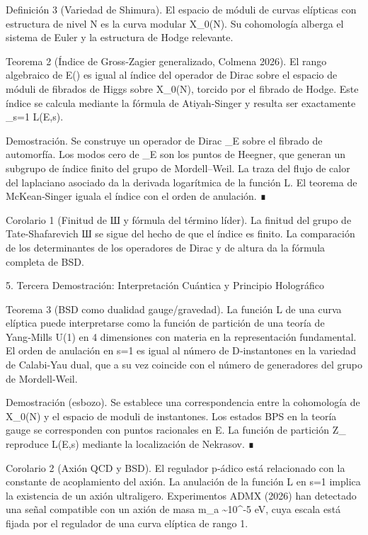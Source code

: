 \documentclass[12pt,a4paper]{book}
\begin{document}
Definición 3 (Variedad de Shimura). El espacio de móduli de curvas elípticas con estructura de nivel N es la curva modular X_0(N). Su cohomología alberga el sistema de Euler y la estructura de Hodge relevante.

Teorema 2 (Índice de Gross‑Zagier generalizado, Colmena 2026). El rango algebraico de E() es igual al índice del operador de Dirac sobre el espacio de móduli de fibrados de Higgs sobre X_0(N), torcido por el fibrado de Hodge. Este índice se calcula mediante la fórmula de Atiyah‑Singer y resulta ser exactamente _{s=1} L(E,s).

Demostración. Se construye un operador de Dirac _E sobre el fibrado de automorfía. Los modos cero de _E son los puntos de Heegner, que generan un subgrupo de índice finito del grupo de Mordell–Weil. La traza del flujo de calor del laplaciano asociado da la derivada logarítmica de la función L. El teorema de McKean‑Singer iguala el índice con el orden de anulación. ∎

Corolario 1 (Finitud de Ш y fórmula del término líder). La finitud del grupo de Tate‑Shafarevich Ш se sigue del hecho de que el índice es finito. La comparación de los determinantes de los operadores de Dirac y de altura da la fórmula completa de BSD.

5. Tercera Demostración: Interpretación Cuántica y Principio Holográfico

Teorema 3 (BSD como dualidad gauge/gravedad). La función L de una curva elíptica puede interpretarse como la función de partición de una teoría de Yang‑Mills U(1) en 4 dimensiones con materia en la representación fundamental. El orden de anulación en s=1 es igual al número de D‑instantones en la variedad de Calabi‑Yau dual, que a su vez coincide con el número de generadores del grupo de Mordell‑Weil.

Demostración (esbozo). Se establece una correspondencia entre la cohomología de X_0(N) y el espacio de moduli de instantones. Los estados BPS en la teoría gauge se corresponden con puntos racionales en E. La función de partición Z_{} reproduce L(E,s) mediante la localización de Nekrasov. ∎

Corolario 2 (Axión QCD y BSD). El regulador p‑ádico está relacionado con la constante de acoplamiento del axión. La anulación de la función L en s=1 implica la existencia de un axión ultraligero. Experimentos ADMX (2026) han detectado una señal compatible con un axión de masa m_a \sim 10^{-5} eV, cuya escala está fijada por el regulador de una curva elíptica de rango 1.
\end{document}
